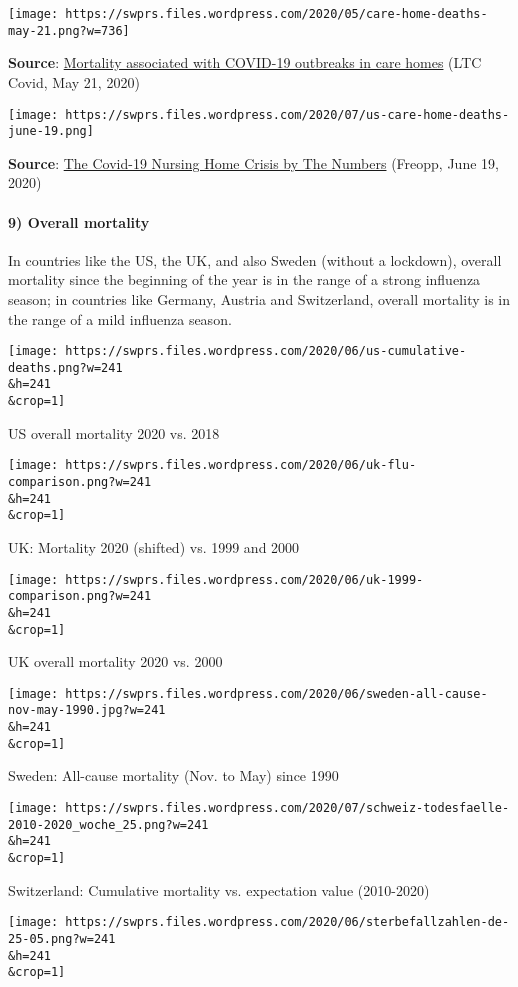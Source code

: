 \texttt{[image: https://swprs.files.wordpress.com/2020/05/care-home-deaths-may-21.png?w=736]}

\textbf{Source}:
\href{https://ltccovid.org/2020/04/12/mortality-associated-with-covid-19-outbreaks-in-care-homes-early-international-evidence/}{Mortality
associated with COVID-19 outbreaks in care homes} (LTC Covid, May 21,
2020)

\texttt{[image: https://swprs.files.wordpress.com/2020/07/us-care-home-deaths-june-19.png]}

\textbf{Source}:
\href{https://freopp.org/the-covid-19-nursing-home-crisis-by-the-numbers-3a47433c3f70}{The
Covid-19 Nursing Home Crisis by The Numbers} (Freopp, June 19, 2020)

\hypertarget{9-overall-mortality}{%
\paragraph{9) Overall mortality}\label{9-overall-mortality}}

In countries like the US, the UK, and also Sweden (without a lockdown),
overall mortality since the beginning of the year is in the range of a
strong influenza season; in countries like Germany, Austria and
Switzerland, overall mortality is in the range of a mild influenza
season.

\texttt{[image: https://swprs.files.wordpress.com/2020/06/us-cumulative-deaths.png?w=241\\\&h=241\\\&crop=1]}

US overall mortality 2020 vs. 2018

\texttt{[image: https://swprs.files.wordpress.com/2020/06/uk-flu-comparison.png?w=241\\\&h=241\\\&crop=1]}

UK: Mortality 2020 (shifted) vs. 1999 and 2000

\texttt{[image: https://swprs.files.wordpress.com/2020/06/uk-1999-comparison.png?w=241\\\&h=241\\\&crop=1]}

UK overall mortality 2020 vs. 2000

\texttt{[image: https://swprs.files.wordpress.com/2020/06/sweden-all-cause-nov-may-1990.jpg?w=241\\\&h=241\\\&crop=1]}

Sweden: All-cause mortality (Nov. to May) since 1990

\texttt{[image: https://swprs.files.wordpress.com/2020/07/schweiz-todesfaelle-2010-2020\_woche\_25.png?w=241\\\&h=241\\\&crop=1]}

Switzerland: Cumulative mortality vs. expectation value (2010-2020)

\texttt{[image: https://swprs.files.wordpress.com/2020/06/sterbefallzahlen-de-25-05.png?w=241\\\&h=241\\\&crop=1]}


